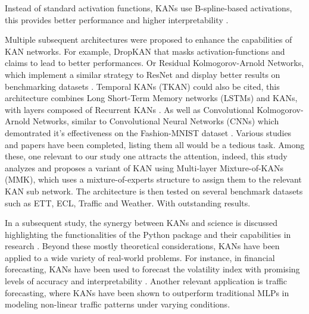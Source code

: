 Instead of standard activation functions, KANs use B-spline-based activations, this provides better performance and higher interpretability \cite{liu2024kan}.

Multiple subsequent architectures were proposed to enhance the capabilities of KAN networks. 
For example, DropKAN \cite{altarabichi2024dropkan} that masks activation-functions and claims to lead to better performances. Or Residual Kolmogorov-Arnold Networks, which implement a similar strategy to ResNet and display better results on benchmarking datasets \cite{yu2024residual}.
Temporal KANs (TKAN) could also be cited, this architecture combines Long Short-Term Memory networks (LSTMs) and KANs, with layers composed of Recurrent KANs \cite{genet2024tkan}. As well as Convolutional Kolmogorov-Arnold Networks, similar to Convolutional Neural Networks (CNNs) which demontrated it's effectiveness on the Fashion-MNIST dataset \cite{bodner2024convolutional}.
Various studies and papers have been completed, listing them all would be a tedious task. Among these, one relevant to our study one attracts the attention, indeed, this study analyzes and proposes a variant of KAN using Multi-layer Mixture-of-KANs (MMK), which uses a mixture-of-experts structure to assign them to the relevant KAN sub network. The architecture is then tested on several benchmark datasets such as ETT, ECL, Traffic and Weather. With outstanding results\cite{han2024kan4tsf}.

In a subsequent study, the synergy between KANs and science is discussed highlighting the functionalities of the Python package and their capabilities in research\cite{liu2024kan} . Beyond these mostly theoretical considerations, KANs have been applied to a wide variety of real-world problems. 
For instance, in financial forecasting, KANs have been used to forecast the volatility index with promising levels of accuracy and interpretability \cite{cho2025forecasting}.
Another relevant application is traffic forecasting, where KANs have been shown to outperform traditional MLPs in modeling non-linear traffic patterns under varying conditions\cite{vaca2024kolmogorov}.